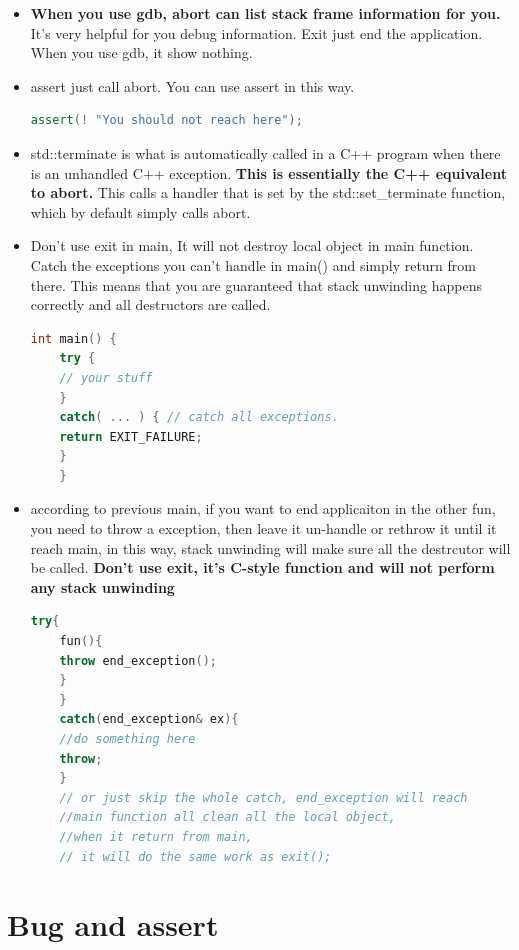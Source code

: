 \documentclass[a4paper,12pt,twoside]{book}
\begin{document}
\begin{itemize}
	\item \textbf{When you use gdb, abort can list stack frame information for you.} It's very helpful for you debug information.  Exit just end the application. When you use gdb, it show nothing.
	
	
	\item assert just call abort. You can use assert in this way.
	\begin{lstlisting}[frame=single, language=c++]
	assert(! "You should not reach here");
	\end{lstlisting}
	
	\item std::terminate is what is automatically called in a C++ program when there is an unhandled C++ exception. \textbf{This is essentially the C++ equivalent to abort.} This calls a handler that is set by the std::set\_terminate function, which by default simply calls abort.
	
	\item Don't use exit in main, It will not destroy local object in main function. Catch the exceptions you can't handle in main() and simply return from there. This means that you are guaranteed that stack unwinding happens correctly and all destructors are called.
	\begin{lstlisting}[frame=single, language=c++]
	int main() {
	try {
	// your stuff
	}
	catch( ... ) { // catch all exceptions.
	return EXIT_FAILURE;
	}
	}
	\end{lstlisting}
	
	\item according to previous main, if you want to end applicaiton in the other fun, you need to throw a exception, then leave it un-handle or rethrow it until it reach main, in this way, stack unwinding will make sure all the destrcutor will be called. \textbf{Don't use exit, it's C-style function and will not perform any stack unwinding}
	\begin{lstlisting}[frame=single, language=c++]
	try{
	fun(){
	throw end_exception();
	}
	}
	catch(end_exception& ex){
	//do something here
	throw;
	}
	// or just skip the whole catch, end_exception will reach
	//main function all clean all the local object,
	//when it return from main,
	// it will do the same work as exit();
	\end{lstlisting}
	
\end{itemize}


\section{Bug and assert}
\end{document}
